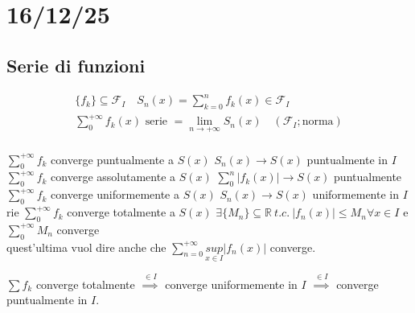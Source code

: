 \documentclass[a4paper, oneside]{article}
\begin{document}
\newpage
\section{16/12/25}
\subsection{Serie di funzioni}
\begin{definition}
  \begin{gather*}
    \{f_k\} \subseteq \mathcal{F}_I \quad S_n(x) = \sum_{k=0}^n f_k(x) \in \mathcal{F}_I\\
    \sum_0^{+\infty} f_k(x) \text{ serie } = \lim_{n \to +\infty} S_n(x) \quad (\mathcal{F}_I; \text{norma}) \\
  \end{gather*}
\end{definition}

\begin{definition}
  $\sum_0^{+\infty} f_k$ converge puntualmente a $S(x)$  $S_n(x) \to S(x)$ puntualmente in $I$\\
  $\sum_0^{+\infty} f_k$ converge assolutamente a $S(x)$  $\sum_0^n |f_k(x)| \to S(x)$ puntualmente\\
  $\sum_0^{+\infty} f_k$ converge uniformemente a $S(x)$  $S_n(x) \to S(x)$ uniformemente in $I$\\rie
  $\sum_0^{+\infty} f_k$ converge totalmente a $S(x)$  $\exists \{M_n\} \subseteq \mathbb{R} \ t.c. \ |f_n(x)| \leq M_n \forall x \in I$ e $\sum_0^{+\infty} M_n$ converge\\
  quest'ultima vuol dire anche che $\sum_{n=0}^{+\infty} \underset{x \in I}{sup} |f_n(x)|$ converge.
\end{definition}

\begin{theorem}
  $\sum f_k$ converge totalmente $ \overset{\in I}{\implies}$ converge uniformemente in $I$ $\overset{\in I}{\implies}$ converge puntualmente in $I$.
\end{theorem}
\end{document}
